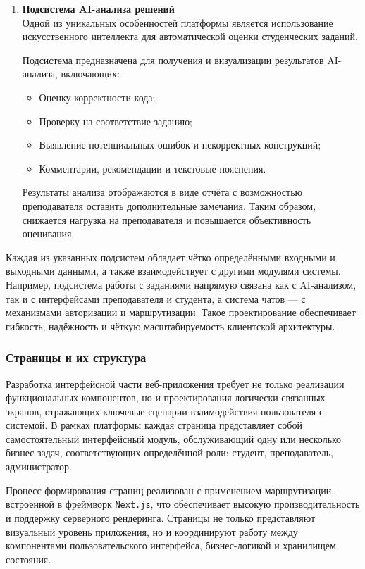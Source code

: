 \begin{enumerate}
  \item \textbf{Подсистема AI-анализа решений}\\
  Одной из уникальных особенностей платформы является использование искусственного интеллекта для автоматической оценки студенческих заданий.
  
  Подсистема предназначена для получения и визуализации результатов AI-анализа, включающих:
  \begin{itemize}
    \item Оценку корректности кода;
    \item Проверку на соответствие заданию;
    \item Выявление потенциальных ошибок и некорректных конструкций;
    \item Комментарии, рекомендации и текстовые пояснения.
  \end{itemize}
  
  Результаты анализа отображаются в виде отчёта с возможностью преподавателя оставить дополнительные замечания. Таким образом, снижается нагрузка на преподавателя и повышается объективность оценивания.

\end{enumerate}

Каждая из указанных подсистем обладает чётко определёнными входными и выходными данными, а также взаимодействует с другими модулями системы. Например, подсистема работы с заданиями напрямую связана как с AI-анализом, так и с интерфейсами преподавателя и студента, а система чатов — с механизмами авторизации и маршрутизации. Такое проектирование обеспечивает гибкость, надёжность и чёткую масштабируемость клиентской архитектуры.


\subsubsection{Страницы и их структура}

Разработка интерфейсной части веб-приложения требует не только реализации функциональных компонентов, но и проектирования логически связанных экранов, отражающих ключевые сценарии взаимодействия пользователя с системой. В рамках платформы каждая страница представляет собой самостоятельный интерфейсный модуль, обслуживающий одну или несколько бизнес-задач, соответствующих определённой роли: студент, преподаватель, администратор.

Процесс формирования страниц реализован с применением маршрутизации, встроенной в фреймворк \texttt{Next.js}, что обеспечивает высокую производительность и поддержку серверного рендеринга. Страницы не только представляют визуальный уровень приложения, но и координируют работу между компонентами пользовательского интерфейса, бизнес-логикой и хранилищем состояния. 


